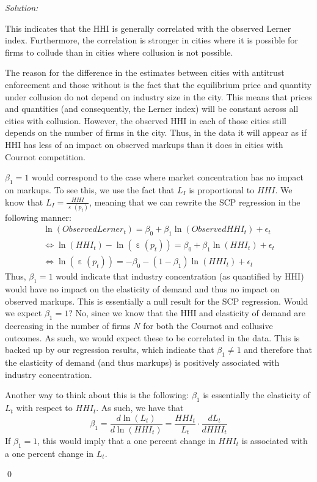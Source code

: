 \documentclass[12pt]{article}
\DeclareMathOperator{\eps}{\varepsilon}
\newenvironment{sol}
    {\emph{Solution:}
    }
    {
    \qed
    }
\begin{document}
\begin{sol}
      This indicates that the HHI is generally correlated with the observed Lerner index. Furthermore, the correlation is stronger in cities where it is possible for firms to collude than in cities where collusion is not possible. 

      The reason for the difference in the estimates between cities with antitrust enforcement and those without is the fact that the equilibrium price and quantity under collusion do not depend on industry size in the city. This means that prices and quantities (and consequently, the Lerner index) will be constant across all cities with collusion. However, the observed HHI in each of those cities still depends on the number of firms in the city. Thus, in the data it will appear as if HHI has less of an impact on observed markups than it does in cities with Cournot competition.

      $\beta_1 = 1$ would correspond to the case where market concentration has no impact on markups. To see this, we use the fact that $L_I$ is proportional to $HHI$. We know that $L_I = \frac{HHI}{\eps(p_t)}$, meaning that we can rewrite the SCP regression in the following manner:
      \begin{align*}
         \ln(ObservedLerner_t) = \beta_0 + \beta_1 \ln(ObservedHHI_t) + \epsilon_t\\
         \iff \ln(HHI_t) - \ln(\eps(p_t)) = \beta_0 + \beta_1 \ln(HHI_t) + \epsilon_t\\
         \iff \ln(\eps(p_t)) = -\beta_0 - (1-\beta_1 )\ln(HHI_t) + \epsilon_t
      \end{align*}
      Thus, $\beta_1 = 1$ would indicate that industry concentration (as quantified by HHI) would have no impact on the elasticity of demand and thus no impact on observed markups. This is essentially a null result for the SCP regression. Would we expect $\beta_1 = 1$? No, since we know that the HHI and elasticity of demand are decreasing in the number of firms $N$ for both the Cournot and collusive outcomes. As such, we would expect these to be correlated in the data. This is backed up by our regression results, which indicate that $\beta_1 \neq 1$ and therefore that the elasticity of demand (and thus markups) is positively associated with industry concentration. 

      Another way to think about this is the following: $\beta_1$ is essentially the elasticity of $L_t$ with respect to $HHI_t$. As such, we have that 
      \[\beta_1 = \frac{d \ln(L_t)}{d \ln(HHI_t)} = \frac{HHI_t}{L_t} \cdot \frac{d L_t}{d HHI_t}\]
      If $\beta_1 = 1$, this would imply that a one percent change in $HHI_t$ is associated with a one percent change in $L_t$. 
\end{sol}
\end{document}
